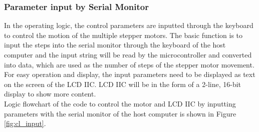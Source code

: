 \subsubsection{Parameter input by Serial Monitor}
In the operating logic, the control parameters are inputted through the keyboard to control the motion of the 
multiple stepper motors. The basic function is to input the steps into the serial monitor through the keyboard 
of the host computer and the input string will be read by the microcontroller and converted into data, which are 
used as the number of steps of the stepper motor movement. For easy operation and display, the input parameters 
need to be displayed as text on the screen of the LCD IIC. LCD IIC will be in the form of a 2-line, 16-bit display 
to show more content. \\
Logic flowchart of the code to control the motor and LCD IIC by inputting parameters with the serial monitor of 
the host computer is shown in Figure \ref{fig:cl_input}.
